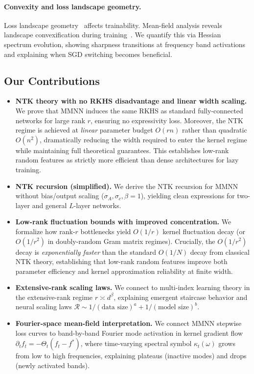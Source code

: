 \documentclass{article}
\begin{document}
\paragraph{Convexity and loss landscape geometry.}
Loss landscape geometry~\cite{li2018visualizing,fort2019large} affects trainability. Mean-field analysis reveals landscape convexification during training~\cite{chizat2020implicit}. We quantify this via Hessian spectrum evolution, showing sharpness transitions at frequency band activations and explaining when SGD switching becomes beneficial.

\subsection*{Our Contributions}
\begin{itemize}
    \item \textbf{NTK theory with no RKHS disadvantage and linear width scaling.} We prove that MMNN induces the same RKHS as standard fully-connected networks for large rank \( r \), ensuring no expressivity loss. Moreover, the NTK regime is achieved at \emph{linear} parameter budget \( O(rn) \) rather than quadratic \( O(n^2) \), dramatically reducing the width required to enter the kernel regime while maintaining full theoretical guarantees. This establishes low-rank random features as strictly more efficient than dense architectures for lazy training.
    \item \textbf{NTK recursion (simplified).} We derive the NTK recursion for MMNN without bias/output scaling (\( \sigma_A, \sigma_c, \beta = 1 \)), yielding clean expressions for two-layer and general \( L \)-layer networks.
    \item \textbf{Low-rank fluctuation bounds with improved concentration.} We formalize how rank-\( r \) bottlenecks yield \( O(1/r) \) kernel fluctuation decay (or \( O(1/r^2) \) in doubly-random Gram matrix regimes). Crucially, the \( O(1/r^2) \) decay is \emph{exponentially faster} than the standard \( O(1/N) \) decay from classical NTK theory, establishing that low-rank random features improve both parameter efficiency and kernel approximation reliability at finite width.
    \item \textbf{Extensive-rank scaling laws.} We connect to multi-index learning theory in the extensive-rank regime \( r \asymp d^\beta \), explaining emergent staircase behavior and neural scaling laws \( \mathcal{R} \sim 1/(\text{data size})^a + 1/(\text{model size})^b \).
    \item \textbf{Fourier-space mean-field interpretation.} We connect MMNN stepwise loss curves to band-by-band Fourier mode activation in kernel gradient flow \( \partial_t f_t = -\Theta_t(f_t - f^*) \), where time-varying spectral symbol \( \kappa_t(\omega) \) grows from low to high frequencies, explaining plateaus (inactive modes) and drops (newly activated bands).

\end{itemize}
\end{document}
